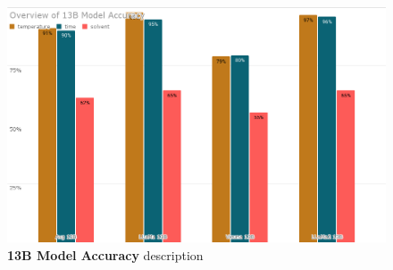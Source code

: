 \begin{figure}[!htbp]
    \begin{centering}
        \includegraphics[width=\textwidth]{img/overview_13b_accuracy}
        \caption[13B Model Accuracy]{\textbf{13B Model Accuracy} description
        }
        \label{fig:7b_acc}
    \end{centering}
\end{figure}

